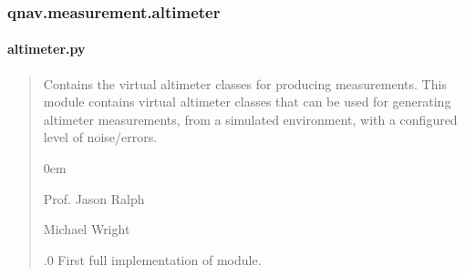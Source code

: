 \documentclass[letterpaper,10pt,english]{sphinxmanual}
\begin{document}
\sphinxstepscope


\subsubsection{qnav.measurement.altimeter}
\label{\detokenize{modules/measurement/altimeter:module-qnav.measurement.altimeter}}\label{\detokenize{modules/measurement/altimeter:qnav-measurement-altimeter}}\label{\detokenize{modules/measurement/altimeter::doc}}

\paragraph{altimeter.py}
\label{\detokenize{modules/measurement/altimeter:altimeter-py}}\begin{quote}\begin{description}
\sphinxAtStartPar
Contains the virtual altimeter classes for producing measurements.
This module contains virtual altimeter classes that can be used for
generating altimeter measurements, from a simulated environment,
with a configured level of noise/errors.

\begin{DUlineblock}{0em}
\item[] Prof. Jason Ralph \sphinxhyphen{} 
\item[] Michael Wright \sphinxhyphen{} 
\end{DUlineblock}

.0 \sphinxhyphen{} First full implementation of module.

\end{description}\end{quote}
\end{document}
